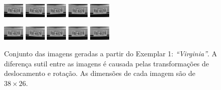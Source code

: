
\begin{figure}[H]
	\centering
	\caption{\label{fig:frames}
	Conjunto das imagens geradas a partir do Exemplar 1: \emph{``Virginia''}. A diferença sutil entre as imagens é causada pelas transformações de deslocamento e rotação.
	As dimensões de cada imagem são de $38 \times 26$.}
	\includegraphics[width=.15\textwidth]{figures/degradedImg/result-0.png}
	\includegraphics[width=.15\textwidth]{figures/degradedImg/result-1.png}
	\includegraphics[width=.15\textwidth]{figures/degradedImg/result-2.png}
	\includegraphics[width=.15\textwidth]{figures/degradedImg/result-3.png}
	\includegraphics[width=.15\textwidth]{figures/degradedImg/result-4.png}

	\includegraphics[width=.15\textwidth]{figures/degradedImg/result-5.png}
	\includegraphics[width=.15\textwidth]{figures/degradedImg/result-6.png}
	\includegraphics[width=.15\textwidth]{figures/degradedImg/result-7.png}
	\includegraphics[width=.15\textwidth]{figures/degradedImg/result-8.png}
	\includegraphics[width=.15\textwidth]{figures/degradedImg/result-9.png} 


\end{figure}
